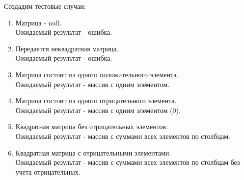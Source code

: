 \documentclass[a4paper,14pt]{extarticle}
\begin{document}
Создадим тестовые случаи:
\begin{enumerate}
    \item Матрица - null. \\
          Ожидаемый результат - ошибка.
    \item Передается неквадратная матрица. \\
          Ожидаемый результат - ошибка.
    \item Матрица состоит из одного положительного элемента.\\
          Ожидаемый результат - массив с одним элементом.
    \item Матрица состоит из одного отрицательного элемента. \\
          Ожидаемый результат - массив с одним элементом (0).
    \item Квадратная матрица без отрицательных элементов. \\
          Ожидаемый результат - массив с суммами всех элементов по столбцам.
    \item Квадратная матрица с отрицательными элементами. \\
          Ожидаемый результат - массив с суммами всех элементов по столбцам без учета отрицательных.
\end{enumerate}
\end{document}
